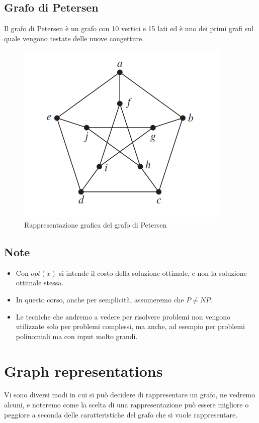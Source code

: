 \documentclass[12pt,a4paper]{article}
\begin{document}
\subsection{Grafo di Petersen}
Il grafo di Petersen è un grafo con 10 vertici e 15 lati ed è uno dei primi grafi sul quale vengono testate delle nuove congetture.
\begin{figure}[h]
	\centering
	\includegraphics[width=0.5\linewidth]{img/petersen_graph.png}
	\caption{Rappresentazione grafica del grafo di Petersen}
	\label{fig:1}
\end{figure}

\subsection{Note}
\begin{itemize}
\item Con $opt(x)$ si intende il costo della soluzione ottimale, e non la soluzione ottimale stessa.
\item In questo corso, anche per semplicità, assumeremo che $P \neq NP$.
\item Le tecniche che andremo a vedere per risolvere problemi non vengono utilizzate solo per problemi complessi, ma anche, ad esempio per problemi polinomiali ma con input molto grandi.
\end{itemize}

\pagebreak
\section{Graph representations}
Vi sono diversi modi in cui si può decidere di rappresentare un grafo, ne vedremo alcuni, e noteremo come la scelta di una rappresentazione può essere migliore o peggiore a seconda delle caratteristiche del grafo che si vuole rappresentare.
\end{document}
